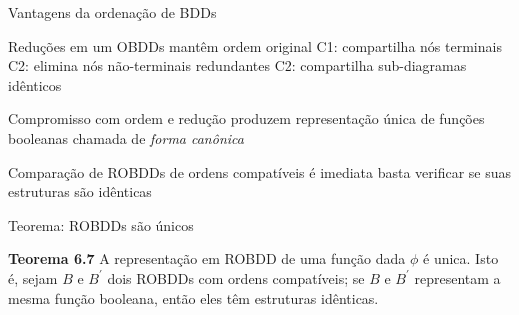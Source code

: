 \expandafter\documentclass\expandafter[table, usenames, svgnames, dvipsnames,14pt, \classopts]{beamer}
\begin{document}
\begin{frame}{Vantagens da ordenação de BDDs}

    \begin{outline}
        \1 Reduções em um OBDDs mantêm ordem original
            \2[-] C1: compartilha nós terminais
            \2[-] C2: elimina nós não-terminais redundantes
            \2[-] C2: compartilha sub-diagramas idênticos
        
        \vspace{1em}
        
        \1 Compromisso com ordem e redução produzem representação única de funções booleanas
            \2[-] chamada de \textit{forma canônica}

            \vspace{1em}
            
        \1 Comparação de ROBDDs de ordens compatíveis é imediata
            \2[-] basta verificar se suas estruturas são idênticas
    \end{outline}

\end{frame}

\begin{frame}{Teorema: ROBDDs são únicos}

    \begin{block}{\textbf{Teorema 6.7}}
        A representação em ROBDD de uma função dada $\phi$ é unica. Isto é, sejam $B$ e $B^\prime$ dois ROBDDs com ordens compatíveis; se $B$ e $B^\prime$ representam a mesma função booleana, então eles têm estruturas idênticas.
    \end{block}

\end{frame}
\end{document}
